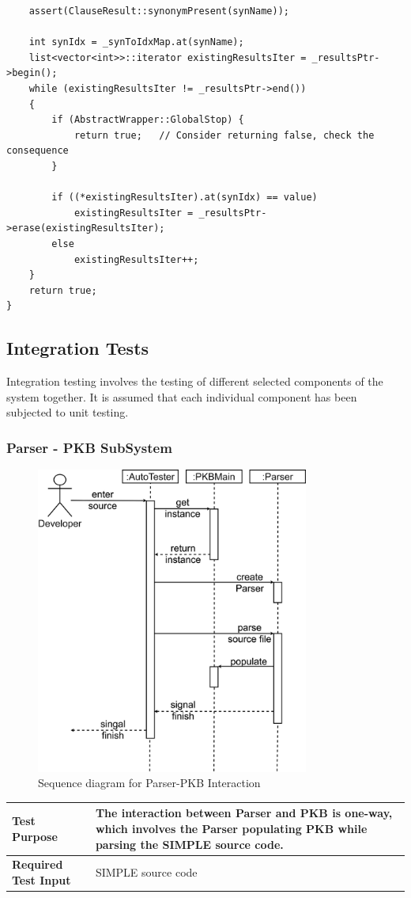 \documentclass[12pt]{article}
\begin{document}
{{{{{{{{{{{{{\begin{tcolorbox}
\begin{verbatim}
    assert(ClauseResult::synonymPresent(synName));

    int synIdx = _synToIdxMap.at(synName);
    list<vector<int>>::iterator existingResultsIter = _resultsPtr->begin();
    while (existingResultsIter != _resultsPtr->end())
    {
        if (AbstractWrapper::GlobalStop) {
            return true;   // Consider returning false, check the consequence
        }

        if ((*existingResultsIter).at(synIdx) == value)
            existingResultsIter = _resultsPtr->erase(existingResultsIter);
        else
            existingResultsIter++;
    }
    return true;
}
\end{verbatim}
\end{tcolorbox}

\normalsize
\newpage
\subsection{Integration Tests}
Integration testing involves the testing of different selected components of the system together. It is assumed that each individual component has been subjected to unit testing.


\subsubsection{Parser - PKB SubSystem}
\begin{figure}[H]
  \centering 
  \caption{Sequence diagram for Parser-PKB Interaction}
 \includegraphics[width=0.8\textwidth]{SDTesting.png}
\end{figure}
\begin{tabular}{|L{5cm} | L{12cm}| }
\hline
\textbf{Test Purpose} &
The interaction between Parser and PKB is one-way, which involves the Parser populating PKB while parsing the SIMPLE source code.
 \\\hline
 \textbf{Required Test Input}
 &
SIMPLE source code \\\hline


\end{tabular}}}}}}}}}}}}}}
\end{document}
